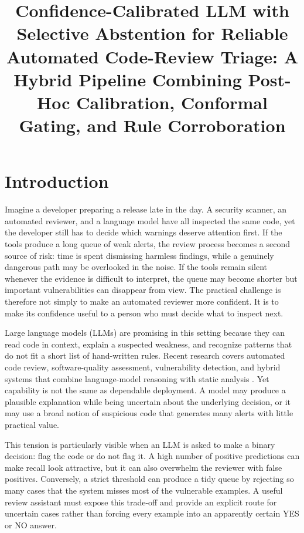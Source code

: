 \documentclass[pdflatex,sn-mathphys-num]{sn-jnl}
\title[Confidence-Calibrated LLM Code Review]{Confidence-Calibrated LLM with Selective Abstention for Reliable Automated Code-Review Triage: A Hybrid Pipeline Combining Post-Hoc Calibration, Conformal Gating, and Rule Corroboration}
\author*[1]{\fnm{Rehan}}
\affil*[1]{\orgname{Lovely Professional University}, \country{India}}
\begin{document}
\maketitle

\section{Introduction}\label{sec:introduction}

Imagine a developer preparing a release late in the day. A security scanner, an automated reviewer, and a language model have all inspected the same code, yet the developer still has to decide which warnings deserve attention first. If the tools produce a long queue of weak alerts, the review process becomes a second source of risk: time is spent dismissing harmless findings, while a genuinely dangerous path may be overlooked in the noise. If the tools remain silent whenever the evidence is difficult to interpret, the queue may become shorter but important vulnerabilities can disappear from view. The practical challenge is therefore not simply to make an automated reviewer more confident. It is to make its confidence useful to a person who must decide what to inspect next.

Large language models (LLMs) are promising in this setting because they can read code in context, explain a suspected weakness, and recognize patterns that do not fit a short list of hand-written rules. Recent research covers automated code review, software-quality assessment, vulnerability detection, and hybrid systems that combine language-model reasoning with static analysis \cite{Borgalli2026,TaghaviFar2025,Tamberg202529698,Gnieciak2025198410}. Yet capability is not the same as dependable deployment. A model may produce a plausible explanation while being uncertain about the underlying decision, or it may use a broad notion of suspicious code that generates many alerts with little practical value.

This tension is particularly visible when an LLM is asked to make a binary decision: flag the code or do not flag it. A high number of positive predictions can make recall look attractive, but it can also overwhelm the reviewer with false positives. Conversely, a strict threshold can produce a tidy queue by rejecting so many cases that the system misses most of the vulnerable examples. A useful review assistant must expose this trade-off and provide an explicit route for uncertain cases rather than forcing every example into an apparently certain YES or NO answer.
\end{document}
